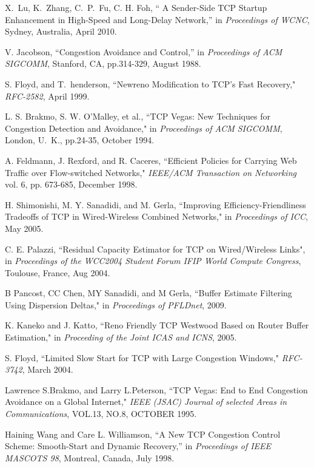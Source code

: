 \documentclass[12pt,onecolumn]{IEEEtran}
\begin{document}
\begin{thebibliography}{99}

X.~Lu, K.~Zhang, C.~P.~Fu, C. H. Foh, `` A Sender-Side TCP Startup Enhancement in High-Speed and Long-Delay Network,'' in \emph{Proceedings of WCNC}, Sydney, Australia, April 2010.

V. Jacobson, ``Congestion Avoidance and Control,'' in \emph{Proceedings of ACM SIGCOMM}, Stanford, CA, pp.314-329, August 1988.

S. Floyd, and T.~henderson, ``Newreno Modification to TCP's Fast Recovery," \emph{RFC-2582}, April 1999.

L. S. Brakmo, S. W. O'Malley, et al., ``TCP Vegas: New Techniques for Congestion Detection and Avoidance," in \emph{Proceedings of ACM SIGCOMM}, London, U.~K., pp.24-35, October 1994.

A. Feldmann, J. Rexford, and R. Caceres, ``Efficient Policies for Carrying Web Traffic over Flow-switched Networks," \emph{IEEE/ACM Transaction on  Networking} vol. 6, pp. 673-685, December 1998.

H. Shimonishi, M. Y. Sanadidi, and M. Gerla, ``Improving Efficiency-Friendliness Tradeoffs of TCP in Wired-Wireless Combined Networks," in \emph{Proceedings of ICC}, May 2005.

C. E. Palazzi, ``Residual Capacity Estimator for TCP on Wired/Wireless Links", in \emph{Proceedings of the WCC2004 Student Forum IFIP World Compute
Congress}, Toulouse, France, Aug 2004.

B Pancost, CC Chen, MY Sanadidi, and M Gerla, ``Buffer Estimate Filtering Using Dispersion Deltas," in \emph{Proceedings of PFLDnet}, 2009.

K. Kaneko and J. Katto, ``Reno Friendly TCP Westwood Based on Router Buffer Estimation," in \emph{Proceeding of the Joint ICAS and ICNS}, 2005.

S. Floyd, ``Limited Slow Start for TCP with Large Congestion Windows," \emph{RFC-3742}, March 2004.





Lawrence S.Brakmo, and Larry L.Peterson, ``TCP Vegas: End to End Congestion Avoidance on a Global Internet," \emph{IEEE (JSAC) Journal of selected Areas in Communications}, VOL.13, NO.8, OCTOBER 1995.


Haining Wang and Care L. Williamson, ``A New TCP Congestion Control Scheme: Smooth-Start and Dynamic Recovery,'' in \emph{Proceedings of IEEE
MASCOTS 98}, Montreal, Canada, July 1998.


\end{thebibliography}
\end{document}
